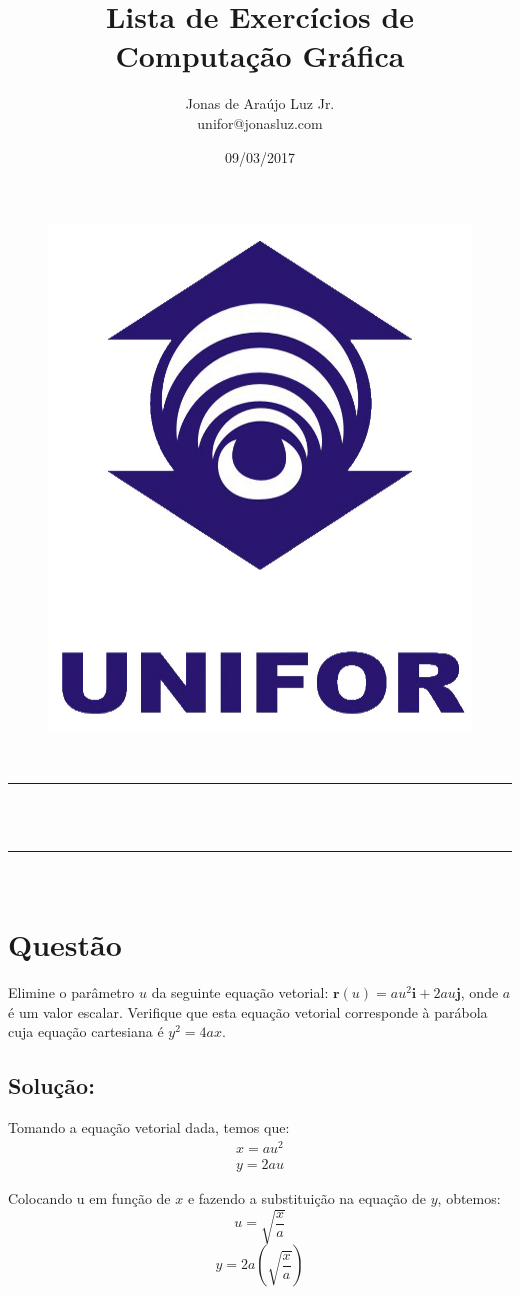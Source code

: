 \documentclass[a4paper,11pt,pagenumber=true]{article}
\makeatletter
\newcommand{\linia}{\rule{\linewidth}{0.5pt}}
\theoremstyle{mytheor}
\renewcommand{\maketitle}{
    \begin{center}
        \vspace{2ex}
        {\huge \textsc{\@title}}
        \vspace{1ex}\\
        \linia\\
        \@author\\ 
        \linia\\
        \vspace{1ex}
        \textsc{\the\institution} 
        \hfill \@date
        \vspace{4ex}
    \end{center}
}
\makeatother
\begin{document}
    \title{Lista de Exercícios de\\Computação Gráfica }

    \author{Jonas de Araújo Luz Jr.\\
    unifor@jonasluz.com}
    \date{09/03/2017}
    
    \begin{figure}[t]
    \centering
        \includegraphics[width=.2\textwidth]{images/logo-UNIFOR.jpg}
        \label{fig:logo}    
    \end{figure}
    
    \maketitle
    \tableofcontents
    \newpage
    
    \section{Questão }
    
        Elimine o parâmetro $u$ da seguinte equação vetorial: $\mathbf{r}(u) = au^2 \mathbf{i} + 2au \mathbf{j}$, onde $a$ é um valor escalar. Verifique que esta equação vetorial corresponde à parábola cuja equação cartesiana é $y^2 = 4ax$.
        
        \subsection*{Solução:}
        
            Tomando a equação vetorial dada, temos que: 
            \begin{equation*}
                \begin{matrix}
                    x = au^2 \\
                    y = 2au
                \end{matrix}
            \end{equation*}
            
            Colocando u em função de $x$ e fazendo a substituição na equação de $y$, obtemos:
            \[u = \sqrt{\frac{x}{a}}\]
            \[y = 2a\left(\sqrt{\frac{x}{a}}\right)\]
            
\end{document}
